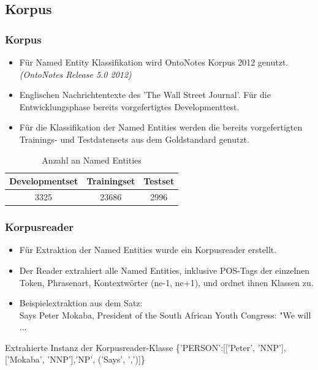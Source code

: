 \documentclass{beamer}
\begin{document}
	\subsection{Korpus}
	\begin{frame}
			\frametitle{Korpus}
			\begin{itemize}
				\item Für Named Entity Klassifikation wird OntoNotes Korpus 2012 genutzt. \textit{(OntoNotes Release 5.0 2012)}
				\item Englischen Nachrichtentexte des 'The Wall Street Journal'.
				Für die Entwicklungsphase bereits vorgefertigtes Developmenttest.
				\item Für die Klassifikation der Named Entities werden die bereits vorgefertigten Trainings- und Testdatensets aus dem Goldstandard genutzt.
			\end{itemize}
			 \begin{table}
			 	\caption{Anzahl an  Named Entities}
			 	\begin{tabular}{ccc}
			 		\toprule
					Developmentset & Trainingset & Testset\\
			 		\midrule
					3325 & 23686 & 2996\\
			 		\bottomrule
			 	\end{tabular}
			 	\label{tab:datasets}
			 \end{table}
	\end{frame}
		\begin{frame}
			\frametitle{Korpusreader}
			\begin{itemize}
				\item Für Extraktion der Named Entities wurde ein Korpusreader erstellt.
				\item 	Der Reader extrahiert alle Named Entities, inklusive POS-Tags der einzelnen Token, Phrasenart, Kontextwörter (ne-1, ne+1), und ordnet ihnen Klassen zu.
				\item Beispielextraktion aus dem Satz:\\
				Says Peter Mokaba, President of the South African Youth Congress: "We will ...
			\end{itemize}
			
			
		
			
			\begin{exampleblock}{Extrahierte Instanz der Korpusreader-Klasse}
				\{'PERSON':[['Peter', 'NNP'],['Mokaba', 'NNP'],'NP', ('Says', ',')]\}
			\end{exampleblock}
			
		\end{frame}
	
\end{document}
